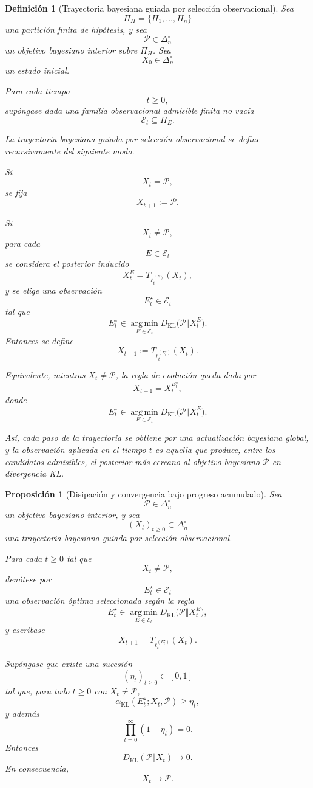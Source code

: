 \documentclass[12pt]{article}
\newtheorem{definicion}{Definición}[section]
\newtheorem{proposicion}{Proposición}[section]
\begin{document}
\begin{definicion}[Trayectoria bayesiana guiada por selección observacional]
Sea
\[
\Pi_H=\{H_1,\dots,H_n\}
\]
una partición finita de hipótesis, y sea
\[
\mathcal P\in\Delta_n^\circ
\]
un objetivo bayesiano interior sobre \(\Pi_H\). Sea
\[
X_0\in\Delta_n^\circ
\]
un estado inicial.

Para cada tiempo
\[
t\geq 0,
\]
supóngase dada una familia observacional admisible finita no vacía
\[
\mathcal E_t\subseteq \Pi_E.
\]

La \emph{trayectoria bayesiana guiada por selección observacional} se define recursivamente del siguiente modo.

Si
\[
X_t=\mathcal P,
\]
se fija
\[
X_{t+1}:=\mathcal P.
\]

Si
\[
X_t\neq \mathcal P,
\]
para cada
\[
E\in\mathcal E_t
\]
se considera el posterior inducido
\[
X_t^E
=
T_{\ell_t^{(E)}}(X_t),
\]
y se elige una observación
\[
E_t^\star\in\mathcal E_t
\]
tal que
\[
E_t^\star
\in
\operatorname*{arg\,min}_{E\in\mathcal E_t}
D_{\mathrm{KL}}\bigl(\mathcal P\Vert X_t^E\bigr).
\]
Entonces se define
\[
X_{t+1}
:=
T_{\ell_t^{(E_t^\star)}}(X_t).
\]

Equivalente, mientras \(X_t\neq \mathcal P\), la regla de evolución queda dada por
\[
X_{t+1}
=
X_t^{E_t^\star},
\]
donde
\[
E_t^\star
\in
\operatorname*{arg\,min}_{E\in\mathcal E_t}
D_{\mathrm{KL}}\bigl(\mathcal P\Vert X_t^E\bigr).
\]

Así, cada paso de la trayectoria se obtiene por una actualización bayesiana global, y la observación aplicada en el tiempo \(t\) es aquella que produce, entre los candidatos admisibles, el posterior más cercano al objetivo bayesiano \(\mathcal P\) en divergencia KL.
\end{definicion}


\begin{proposicion}[Disipación y convergencia bajo progreso acumulado]
Sea
\[
\mathcal P\in\Delta_n^\circ
\]
un objetivo bayesiano interior, y sea
\[
(X_t)_{t\geq 0}\subset\Delta_n^\circ
\]
una trayectoria bayesiana guiada por selección observacional.

Para cada \(t\geq 0\) tal que
\[
X_t\neq \mathcal P,
\]
denótese por
\[
E_t^\star\in\mathcal E_t
\]
una observación óptima seleccionada según la regla
\[
E_t^\star
\in
\operatorname*{arg\,min}_{E\in\mathcal E_t}
D_{\mathrm{KL}}\bigl(\mathcal P\Vert X_t^E\bigr),
\]
y escríbase
\[
X_{t+1}
=
T_{\ell_t^{(E_t^\star)}}(X_t).
\]

Supóngase que existe una sucesión
\[
(\eta_t)_{t\geq 0}\subset[0,1]
\]
tal que, para todo \(t\geq 0\) con \(X_t\neq \mathcal P\),
\[
\alpha_{\mathrm{KL}}(E_t^\star;X_t,\mathcal P)\geq \eta_t,
\]
y además
\[
\prod_{t=0}^{\infty}(1-\eta_t)=0.
\]
Entonces
\[
D_{\mathrm{KL}}(\mathcal P\Vert X_t)\longrightarrow 0.
\]
En consecuencia,
\[
X_t\longrightarrow \mathcal P.
\]
\end{proposicion}
\end{document}
